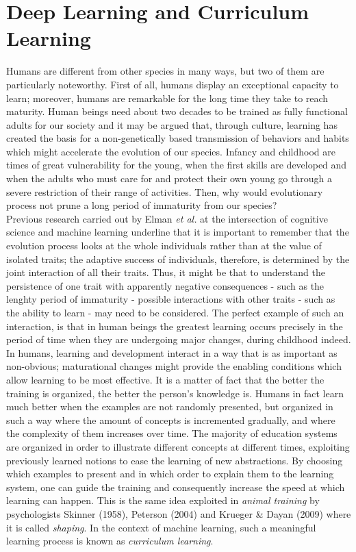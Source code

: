 \chapter{Deep Learning and Curriculum Learning}
Humans are different from other species in many ways, but two of them are particularly noteworthy. 
First of all, humans display an exceptional capacity to learn;
moreover, humans are remarkable for the long time they take to reach maturity. Human beings need about two decades to be trained as fully functional adults for our society and it may
be argued that, through culture, learning has created the basis for a non-genetically based transmission of behaviors and habits which might
accelerate the evolution of our species. Infancy and childhood are times of great vulnerability for the young, when the first skills are developed and when the adults who
must care for and protect their own young go through a severe restriction of their range of activities. Then, why would evolutionary process not prune a long period of 
immaturity from our species? \\ Previous research carried out by Elman \textit{et al.} \cite{ELMAN199371} at the intersection of cognitive science
and machine learning underline that it is important to remember that the evolution process looks at the whole individuals rather than at the value of isolated traits; the adaptive success of individuals, therefore, is 
determined by the joint interaction of all their traits. Thus, it might be that to understand the persistence of one trait with apparently negative consequences - such as the lenghty period of immaturity - possible interactions
with other traits - such as the ability to learn - may need to be considered. The perfect example of such an interaction, is that in human beings the greatest learning occurs precisely in the period of time
when they are undergoing major changes, during childhood indeed.\\
In humans, learning and development interact in a way that is as important as non-obvious; maturational changes might provide the enabling 
conditions which allow learning to be most effective.
It is a matter of fact that the better the training is organized, the better the person's knowledge is. Humans in fact learn much better when the examples are not randomly presented, but organized in such a way 
where the amount of concepts is incremented gradually, and where the complexity of them increases over time. The majority of education systems are organized in order to illustrate 
different concepts at different times, exploiting previously learned notions to ease the learning of new abstractions. By choosing which examples to present and in which order to explain them to the learning system, one can guide the
training and consequently increase the speed at which learning can happen. This is the same idea exploited in \textit{animal training} by psychologists Skinner (1958), Peterson (2004) and Krueger \& Dayan (2009)
where it is called \textit{shaping}.
In the context of machine learning, such a meaningful learning process is known as \textit{curriculum learning}.

